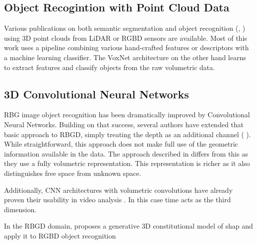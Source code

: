 \documentclass[10pt,twocolumn,letterpaper]{article}
\begin{document}




\subsection{Object Recogintion with Point Cloud Data}
Various publications on both semantic segmentation \cite{koppula2011semantic} and object recognition 
(\cite{teichman2011towards}, \cite{golovinskiy2009shape}) using 3D point clouds from LiDAR or RGBD sensors are available. 
Most of this work uses a pipeline combining various hand-crafted features or descriptors with a machine learning classifier.
The VoxNet architecture on the other hand learns to extract features and classify objects from the raw volumetric data.


\subsection{3D  Convolutional Neural Networks}
RBG image object recognition has been dramatically improved by Convolutional Neural Networks.
Building on that success, several authors have extended that basic approach to RBGD, simply treating the depth as 
an additional channel (\cite{socher2012convolutional} \cite{hoft2014fast}). While straightforward, this approach does not
make full use of the geometric information available in the data. 
The approach described in \cite{voxnet} differs from this as they 
use a fully volumetric representation. This representation is richer as it also distinguishes free space from unknown space.

Additionally, CNN architectures with volumetric convolutions have already proven their usability in video analysis \cite{ji20133d}. In this
case time acts as the third dimension.



In the RBGD domain, \cite{shape} proposes a generative 3D constitutional model of shap and apply it to RGBD object recognition
\end{document}
